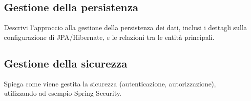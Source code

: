 \subsection{Gestione della persistenza}
Descrivi l'approccio alla gestione della persistenza dei dati, inclusi i dettagli sulla configurazione di JPA/Hibernate, e le relazioni tra le entità principali.

\subsection{Gestione della sicurezza}
Spiega come viene gestita la sicurezza (autenticazione, autorizzazione), utilizzando ad esempio Spring Security.